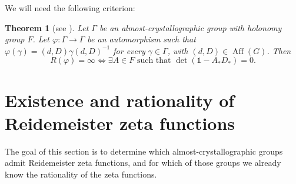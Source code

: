 \documentclass[a4paper]{article}
\theoremstyle{plain}
\newtheorem{theorem}{Theorem}[section]
\theoremstyle{definition}
\theoremstyle{remark}
\DeclareMathOperator{\Aff}{Aff}
\newcommand{\I}{\mathds{1}}
\begin{document}
\medskip

We will need the following criterion:
\begin{theorem}[see \cite{dp11-1}]
	\label{thm:det1-AD}
	Let \(\Gamma\) be an almost-crystallographic group with holonomy group \(F\). Let \(\varphi: \Gamma \to \Gamma\) be an automorphism such that \(\varphi(\gamma) = (d,D)\gamma(d,D)^{-1}\) for every \(\gamma \in \Gamma\), with \((d,D) \in \Aff(G)\). Then
	\begin{equation*}
	R(\varphi) = \infty \iff \exists A \in F \mbox{ such that } \det(\I - A_*D_*) = 0.
	\end{equation*}
\end{theorem}


\section{Existence and rationality of Reidemeister zeta functions}
The goal of this section is to determine which almost-crystallographic groups admit Reidemeister zeta functions, and for which of those groups we already know the rationality of the zeta functions.
\end{document}
